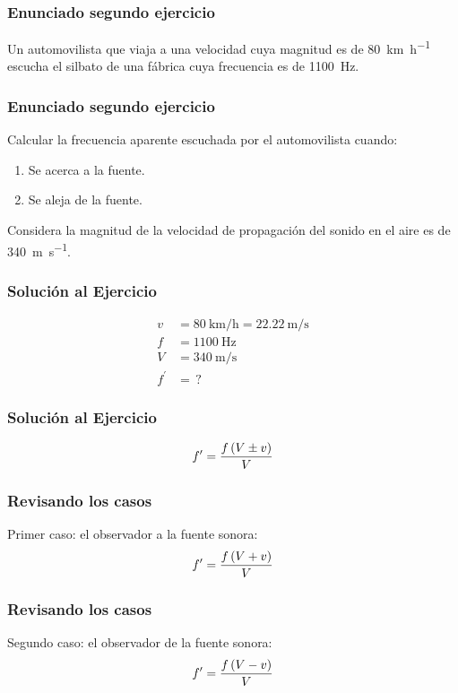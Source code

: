 \documentclass[14pt]{beamer}
\begin{document}
\begin{frame}
\frametitle{Enunciado segundo ejercicio}
Un automovilista que viaja a una velocidad cuya magnitud es de \SI{80}{\kilo\meter\per\hour} escucha el silbato de una fábrica cuya frecuencia es de \SI{1100}{\hertz}.
\end{frame}
\begin{frame}
\frametitle{Enunciado segundo ejercicio}
Calcular la frecuencia aparente escuchada por el automovilista cuando:
\pause
{}
\begin{enumerate}[<+->]
\item Se acerca a la fuente.
\item Se aleja de la fuente.
\end{enumerate}
\pause
Considera la magnitud de la velocidad de propagación del sonido en el aire es de \SI{340}{\meter\per\second}.
\end{frame}
\begin{frame}
\frametitle{Solución al Ejercicio}
\pause
\begin{align*}
v &= \SI{80}{\kilo\meter\per\hour} = \SI{22.22}{\meter\per\second} \\
f &= \SI{1100}{\hertz} \\
V &= \SI{340}{\meter\per\second} \\
f^{\prime} &= \, ?
\end{align*}
\end{frame}
\begin{frame}
\frametitle{Solución al Ejercicio}
\begin{align*}
{f}^{\prime} = \dfrac{f \, (V \pm v)}{V}
\end{align*}
\end{frame}
\begin{frame}
\frametitle{Revisando los casos}
Primer caso: el observador  a la fuente sonora:
\pause
\begin{align*}
{f}^{\prime} = \dfrac{f \, (V + v)}{V}
\end{align*}
\end{frame}
\begin{frame}
\frametitle{Revisando los casos}
Segundo caso: el observador  de la fuente sonora:
\pause
\begin{align*}
{f}^{\prime} = \dfrac{f \, (V - v)}{V}
\end{align*}
\end{frame}
\end{document}
